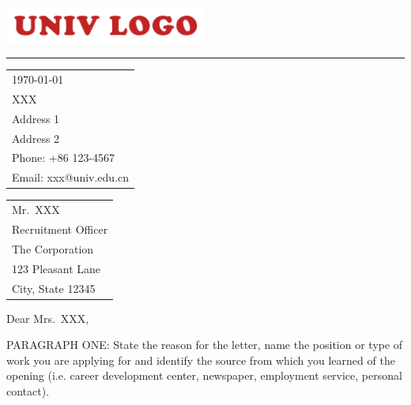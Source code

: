 \documentclass[11pt]{article}
\begin{document}

\includegraphics[width=0.5\textwidth]{UnivLogo.png} %

\vspace{-1em} %

\rule{\linewidth}{1pt} %

\vspace{1.5em} %


\hfill
\begin{tabular}{l @{}}
	\today \bigskip\\ %
	XXX \\
	Address 1 \\ %
	Address 2 \\
	Phone: +86 123-4567 \\
	Email: xxx@univ.edu.cn
\end{tabular}

\bigskip


\begin{tabular}{@{} l}
	Mr.\ XXX \\
	Recruitment Officer \\
	The Corporation \\
	123 Pleasant Lane \\
	City, State 12345
\end{tabular}

\bigskip

Dear Mrs.\ XXX,

\bigskip


PARAGRAPH ONE: State the reason for the letter, name the position or type of work you are applying for and identify the source from which you learned of the opening (i.e. career development center, newspaper, employment service, personal contact).
\end{document}
